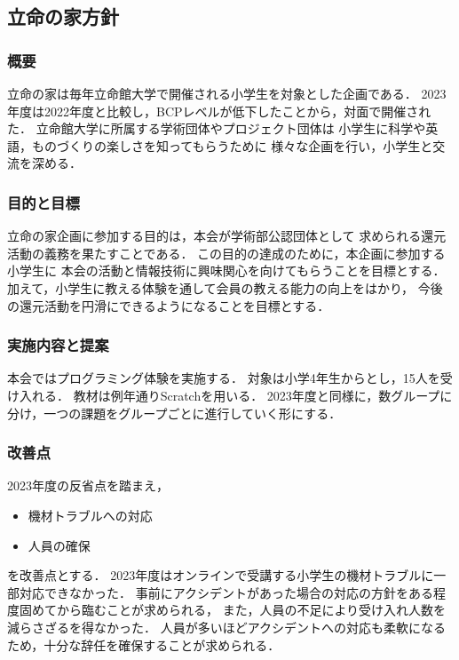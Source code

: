\subsection*{立命の家方針}


\subsubsection*{概要}
立命の家は毎年立命館大学で開催される小学生を対象とした企画である．
2023年度は2022年度と比較し，BCPレベルが低下したことから，対面で開催された．
立命館大学に所属する学術団体やプロジェクト団体は
小学生に科学や英語，ものづくりの楽しさを知ってもらうために
様々な企画を行い，小学生と交流を深める．

\subsubsection*{目的と目標}
立命の家企画に参加する目的は，本会が学術部公認団体として
求められる還元活動の義務を果たすことである．
この目的の達成のために，本企画に参加する小学生に
本会の活動と情報技術に興味関心を向けてもらうことを目標とする．
加えて，小学生に教える体験を通して会員の教える能力の向上をはかり，
今後の還元活動を円滑にできるようになることを目標とする．

\subsubsection*{実施内容と提案}
本会ではプログラミング体験を実施する．
対象は小学4年生からとし，15人を受け入れる．
教材は例年通りScratchを用いる．
2023年度と同様に，数グループに分け，一つの課題をグループごとに進行していく形にする．

\subsubsection*{改善点}
2023年度の反省点を踏まえ，
\begin{itemize}
  \item 機材トラブルへの対応
  \item 人員の確保
\end{itemize}
を改善点とする．
2023年度はオンラインで受講する小学生の機材トラブルに一部対応できなかった．
事前にアクシデントがあった場合の対応の方針をある程度固めてから臨むことが求められる，
また，人員の不足により受け入れ人数を減らさざるを得なかった．
人員が多いほどアクシデントへの対応も柔軟になるため，十分な辞任を確保することが求められる．

